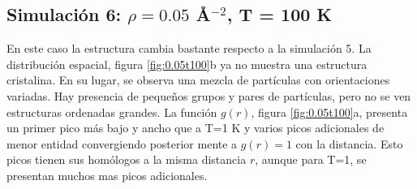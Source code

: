\subsection{Simulación 6: $\rho = 0.05$ \AA$^{-2}$, T = 100 K}

En este caso la estructura cambia bastante respecto a la simulación 5. La distribución espacial, figura \ref{fig:0.05t100}b ya no muestra una estructura cristalina. En su lugar, se observa una mezcla de partículas con orientaciones variadas. Hay presencia de pequeños grupos y pares de partículas, pero no se ven estructuras ordenadas grandes. La función $g(r)$, figura \ref{fig:0.05t100}a,  presenta un primer pico más bajo y ancho que a T=1 K y varios picos adicionales de menor entidad convergiendo posterior mente a $g(r)=1$ con la distancia. Esto picos tienen sus homólogos a la misma distancia $r$, aunque para T=1, se presentan muchos mas picos adicionales. 


